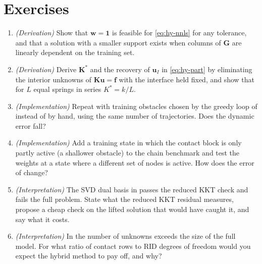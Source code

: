 \section*{Exercises}\label{sec:hy-exercises}
\begin{enumerate}
\item \emph{(Derivation)} Show that $\bm w=\bm 1$ is feasible for \eqref{eq:hy-nnls} for any tolerance, and that a solution with a smaller support exists when columns of $\bm G$ are linearly dependent on the training set.
\item \emph{(Derivation)} Derive $\bm K^*$ and the recovery of $\bm u_I$ in \eqref{eq:hy-part} by eliminating the interior unknowns of $\bm K\bm u=\bm f$ with the interface held fixed, and show that for $L$ equal springs in series $K^*=k/L$.
\item \emph{(Implementation)} Repeat  with training obstacles chosen by the greedy loop of  instead of by hand, using the same number of trajectories. Does the dynamic error fall?
\item \emph{(Implementation)} Add a training state in which the contact block is only partly active (a shallower obstacle) to the chain benchmark and test the weights at a state where a different set of nodes is active. How does the error of  change?
\item \emph{(Interpretation)} The SVD dual basis in  passes the reduced KKT check and fails the full problem. State what the reduced KKT residual measures, propose a cheap check on the lifted solution that would have caught it, and say what it costs.
\item \emph{(Interpretation)} In  the number of unknowns exceeds the size of the full model. For what ratio of contact rows to RID degrees of freedom would you expect the hybrid method to pay off, and why?
\end{enumerate}

\chapterrefs
